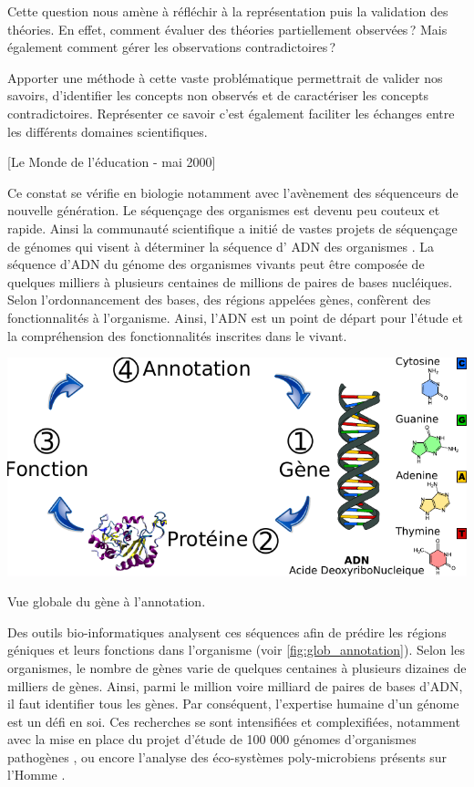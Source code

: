 \begin{refsegment}
Cette question nous amène à réfléchir à la représentation puis la validation des théories. En effet, comment évaluer des théories partiellement observées ? Mais également comment gérer les observations contradictoires ?

Apporter une méthode à cette vaste problématique permettrait de valider nos savoirs, d'identifier les concepts non observés et de caractériser les concepts contradictoires. Représenter ce savoir c'est également faciliter les échanges entre les différents domaines scientifiques.

[Le Monde de l'éducation - mai 2000]

Ce constat se vérifie en biologie notamment avec l'avènement des séquenceurs de nouvelle génération. Le séquençage des organismes est devenu peu couteux et rapide. Ainsi la communauté scientifique a initié de vastes projets de séquençage de génomes qui visent à déterminer la séquence d' \gls{ADN} des organismes . La séquence d'\gls{ADN} du génome des organismes vivants peut être composée de quelques milliers à plusieurs centaines de millions de paires de bases nucléiques. Selon l'ordonnancement des bases, des régions appelées gènes, confèrent des fonctionnalités à l'organisme. Ainsi, l'\gls{ADN} est un point de départ pour l'étude et la compréhension des fonctionnalités inscrites dans le vivant.


\begin{shadedfigure}
    \centering
    \includegraphics{img/simple_annotation_process.pdf}
    \caption{Vue globale du gène à l'annotation.}
    \label{fig:glob_annotation}
\end{shadedfigure}

Des outils bio-informatiques analysent ces séquences afin de prédire les régions géniques et leurs fonctions dans l'organisme (voir \cref{fig:glob_annotation}). Selon les organismes, le nombre de gènes varie de quelques centaines à plusieurs dizaines de milliers de gènes. Ainsi, parmi le million voire milliard de paires de bases d'\gls{ADN}, il faut identifier tous les gènes. Par conséquent, l'expertise humaine d'un génome est un défi en soi. Ces recherches se sont intensifiées et complexifiées, notamment avec la mise en place du projet d'étude de 100 000 génomes d'organismes pathogènes \cite{100kfoodborne}, ou encore l'analyse des éco-systèmes poly-microbiens présents sur l'Homme \cite{hmp}.


\end{refsegment}
